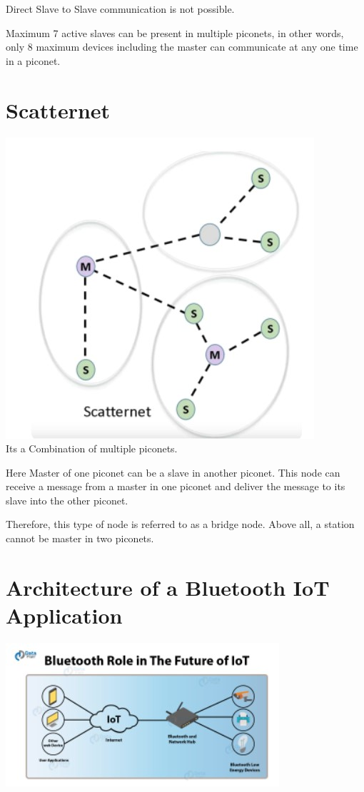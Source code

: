 \documentclass{report}
\begin{document}
\begin{multicols}{1}
    Direct Slave to Slave communication is not possible.

    Maximum 7 active slaves can be present in multiple piconets, in other words, only 8 maximum devices including the master can communicate at any one time in a piconet.

    \section*{Scatternet}
    \includegraphics{Scatternet}\\
   
    Its a Combination of multiple piconets.

    Here Master of one piconet can be a slave in another piconet. This node can receive a message from a master in one piconet and deliver the message to its slave into the other piconet.

    Therefore, this type of node is referred to as a bridge node. Above all, a station cannot be master in two piconets.
    
    \section*{Architecture of a Bluetooth IoT Application}
    \includegraphics{IOT Architecture}\\


\end{multicols}
\end{document}

